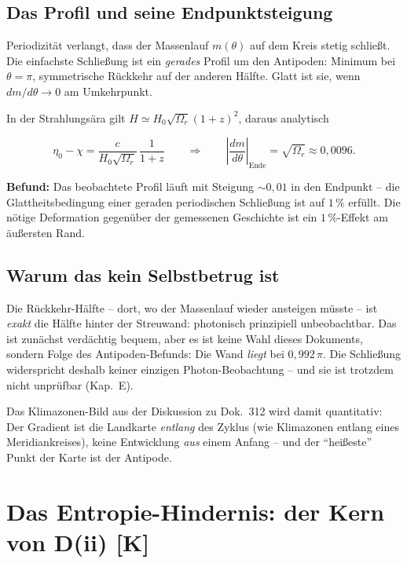 \section{Das Profil und seine Endpunktsteigung}

Periodizität verlangt, dass der Massenlauf $m(\theta)$ auf dem
Kreis stetig schließt. Die einfachste Schließung ist ein
\emph{gerades} Profil um den Antipoden: Minimum bei $\theta=\pi$,
symmetrische Rückkehr auf der anderen Hälfte. Glatt ist sie, wenn
$dm/d\theta \to 0$ am Umkehrpunkt.

In der Strahlungsära gilt $H \simeq H_0\sqrt{\Omega_r}(1{+}z)^2$,
daraus analytisch

\[
  \eta_0 - \chi = \frac{c}{H_0\sqrt{\Omega_r}}\,\frac{1}{1{+}z}
  \qquad\Longrightarrow\qquad
  \left|\frac{dm}{d\theta}\right|_{\text{Ende}}
  = \sqrt{\Omega_r} \approx 0{,}0096.
\]

\textbf{Befund:} Das beobachtete Profil läuft mit Steigung
$\sim 0{,}01$ in den Endpunkt -- die Glattheitsbedingung einer
geraden periodischen Schließung ist auf $1\,\%$ erfüllt. Die
nötige Deformation gegenüber der gemessenen Geschichte ist ein
$1\,\%$-Effekt am äußersten Rand.

\section{Warum das kein Selbstbetrug ist}

Die Rückkehr-Hälfte -- dort, wo der Massenlauf wieder ansteigen
müsste -- ist \emph{exakt} die Hälfte hinter der Streuwand:
photonisch prinzipiell unbeobachtbar. Das ist zunächst verdächtig
bequem, aber es ist keine Wahl dieses Dokuments, sondern Folge des
Antipoden-Befunds: Die Wand \emph{liegt} bei $0{,}992\,\pi$. Die
Schließung widerspricht deshalb keiner einzigen Photon-Beobachtung
-- und sie ist trotzdem nicht unprüfbar (Kap.~E).

Das Klimazonen-Bild aus der Diskussion zu Dok.~312 wird damit
quantitativ: Der Gradient ist die Landkarte \emph{entlang} des
Zyklus (wie Klimazonen entlang eines Meridiankreises), keine
Entwicklung \emph{aus} einem Anfang -- und der \enquote{heißeste}
Punkt der Karte ist der Antipode.

\chapter{Das Entropie-Hindernis: der Kern von D(ii) [K]}

